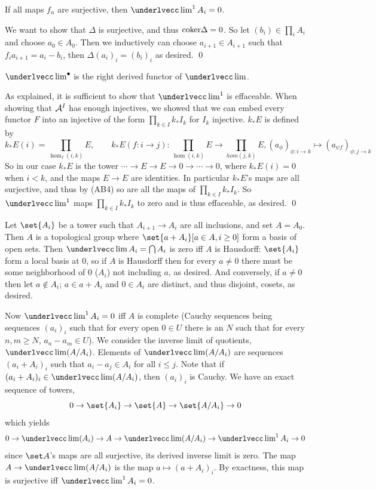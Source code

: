 \blemm

    If all maps $f_n$ are surjective, then $\ilim^1A_i=0$.

\elemm

\bproof

    We want to show that $\Delta$ is surjective, and thus ${\rm coker}\Delta=0$.
    So let $(b_i)\in\prod_iA_i$ and choose $a_0\in A_0$.
    Then we inductively can choose $a_{i+1}\in A_{i+1}$ such that $f_ia_{i+1}=a_i-b_i$, then $\Delta(a_i)_i=(b_i)_i$ as desired.
    \qed

\eproof

\bcoro

    $\ilim^\bul$ is the right derived functor of $\ilim$.

\ecoro

\bproof

    As explained, it is sufficient to show that $\ilim^1$ is effaceable.
    When showing that ${{\cal A}}^I$ has enough injectives, we showed that we can embed every functor $F$ into an injective of the form $\prod_{k\in I}k_*I_k$ for $I_k$ injective.
    $k_*E$ is defined by
    $$ k_*E(i) = \prod_{\hom_I(i,k)}E,\qquad k_*E(f\colon i\to j)\colon\prod_{\hom(i,k)}E\to\prod_{hom(j,k)}E,(a_\phi)_{\phi\colon i\to k}\mapsto(a_{\psi f})_{\phi\colon j\to k} $$
    So in our case $k_*E$ is the tower $\cdots\to E\to E\to0\to\cdots\to0$, where $k_*E(i)=0$ when $i<k$, and the maps $E\to E$ are identities.
    In particular $k_*E$'s maps are all surjective, and thus by (AB4\star) so are all the maps of $\prod_{k\in I}k_*I_k$.
    So $\ilim^1$ maps $\prod_{k\in I}k_*I_k$ to zero and is thus effaceable, as desired.
    \qed

\eproof

\bexam

    Let $\set{A_i}$ be a tower such that $A_{i+1}\to A_i$ are all inclusions, and set $A=A_0$.
    Then $A$ is a topological group where $\set{a+A_i}[a\in A,i\geq0]$ form a basis of open sets.
    Then $\ilim A_i=\bigcap A_i$ is zero iff $A$ is Hausdorff: $\set{A_i}$ form a local basis at $0$, so if $A$ is Hausdorff then for every $a\neq0$ there must be some neighborhood
    of $0$ ($A_i$) not including $a$, as desired.
    And conversely, if $a\neq0$ then let $a\notin A_i$; $a\in a+A_i$ and $0\in A_i$ are distinct, and thus disjoint, cosets, as desired.

    Now $\ilim^1A_i=0$ iff $A$ is complete (Cauchy sequences being sequences $(a_i)_i$ such that for every open $0\in U$ there is an $N$ such that for every $n,m\geq N$, $a_n-a_m\in U$).
    We consider the inverse limit of quotients, $\ilim(A/A_i)$.
    Elements of $\ilim(A/A_i)$ are sequences $(a_i+A_i)_i$ such that $a_i-a_j\in A_i$ for all $i\leq j$.
    Note that if $(a_i+A_i)_i\in\ilim(A/A_i)$, then $(a_i)_i$ is Cauchy.
    We have an exact sequence of towers,
    $$ 0 \to \set{A_i} \to \set{A} \to \set{A/A_i} \to 0 $$
    which yields
    $$ 0 \to \ilim(A_i) \to A \to \ilim(A/A_i) \to \ilim^1A_i \to 0 $$
    since $\set A$'s maps are all surjective, its derived inverse limit is zero.
    The map $A\to\ilim(A/A_i)$ is the map $a\mapsto(a+A_i)_i$.
    By exactness, this map is surjective iff $\ilim^1A_i=0$.


